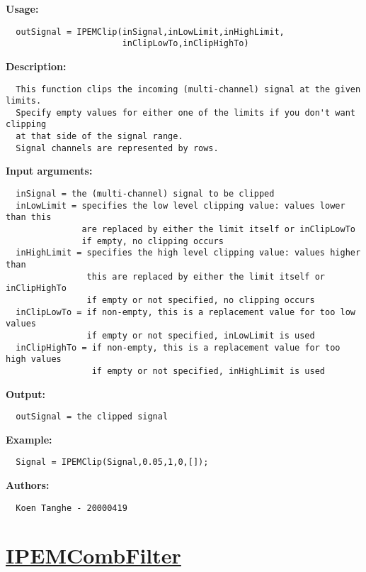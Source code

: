 \textbf{Usage:}
\begin{verbatim}  outSignal = IPEMClip(inSignal,inLowLimit,inHighLimit,
                       inClipLowTo,inClipHighTo)

\end{verbatim}
\textbf{Description:}
\begin{verbatim}  This function clips the incoming (multi-channel) signal at the given limits.
  Specify empty values for either one of the limits if you don't want clipping
  at that side of the signal range.
  Signal channels are represented by rows.

\end{verbatim}
\textbf{Input arguments:}
\begin{verbatim}  inSignal = the (multi-channel) signal to be clipped
  inLowLimit = specifies the low level clipping value: values lower than this
               are replaced by either the limit itself or inClipLowTo
               if empty, no clipping occurs
  inHighLimit = specifies the high level clipping value: values higher than
                this are replaced by either the limit itself or inClipHighTo
                if empty or not specified, no clipping occurs
  inClipLowTo = if non-empty, this is a replacement value for too low values
                if empty or not specified, inLowLimit is used
  inClipHighTo = if non-empty, this is a replacement value for too high values
                 if empty or not specified, inHighLimit is used

\end{verbatim}
\textbf{Output:}
\begin{verbatim}  outSignal = the clipped signal

\end{verbatim}
\textbf{Example:}
\begin{verbatim}  Signal = IPEMClip(Signal,0.05,1,0,[]);

\end{verbatim}
\textbf{Authors:}
\begin{verbatim}  Koen Tanghe - 20000419
\end{verbatim}


\newpage
\section*{\hyperlink{Concepts:IPEMCombFilter}{IPEMCombFilter}}
\hypertarget{FuncRef:IPEMCombFilter}{}

